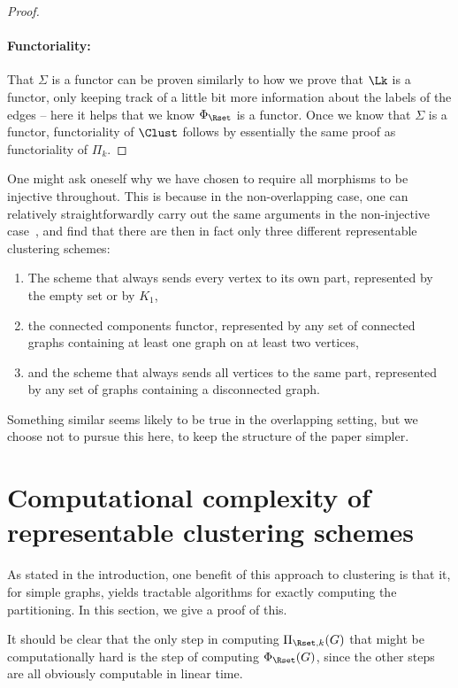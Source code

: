 \documentclass[a4paper,reqno,oneside]{article} %
\begin{document}
\begin{proof}
    \paragraph*{Functoriality:} That $\Sigma$ is a functor can be proven similarly to how we prove that $\Lk$ is a functor, only keeping track of a little bit more information about the labels of the edges -- here it helps that we know $\Phi_\Rset$ is a functor. Once we know that $\Sigma$ is a functor, functoriality of $\Clust$ follows by essentially the same proof as functoriality of $\Pi_k$.
\end{proof}

\begin{remark}
    One might ask oneself why we have chosen to require all morphisms to be injective throughout. This is because in the non-overlapping case, one can relatively straightforwardly carry out the same arguments in the non-injective case~\cite{carlsson_memoli_2013}, and find that there are then in fact only three different representable clustering schemes:
    \begin{enumerate}
        \item The scheme that always sends every vertex to its own part, represented by the empty set or by $K_1$,
        \item the connected components functor, represented by any set of connected graphs containing at least one graph on at least two vertices,
        \item and the scheme that always sends all vertices to the same part, represented by any set of graphs containing a disconnected graph.
    \end{enumerate}

    Something similar seems likely to be true in the overlapping setting, but we choose not to pursue this here, to keep the structure of the paper simpler.
\end{remark}

\section{Computational complexity of representable clustering schemes}

As stated in the introduction, one benefit of this approach to clustering is that it, for simple graphs, yields tractable algorithms for exactly computing the partitioning. In this section, we give a proof of this.

It should be clear that the only step in computing $\Pi_{\Rset,k}(G)$ that might be computationally hard is the step of computing $\Phi_\Rset(G)$, since the other steps are all obviously computable in linear time.
\end{document}
